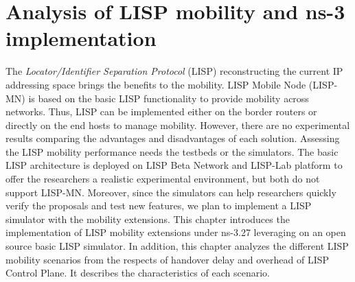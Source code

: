 
\chapter{Analysis of LISP mobility and ns-3 implementation}
\label{cha:ns-3}

\ifpdf
    \graphicspath{{Chapter7/Pics/Raster/}{Chapter7/Pics/PDF/}{Chapter7/}}
\else
    \graphicspath{{Chapter7/Pics/Vector/}{Chapter7/}}
\fi

The \emph{Locator/Identifier Separation Protocol} (LISP) reconstructing the current IP addressing space brings the benefits to the mobility. LISP Mobile Node (LISP-MN) is based on the basic LISP functionality to provide mobility across networks. Thus, LISP can be implemented either on the border routers or directly on the end hosts to manage mobility. However, there are no experimental results comparing the advantages and disadvantages of each solution. Assessing the LISP mobility performance needs the testbeds or the simulators. The basic LISP architecture is deployed on LISP Beta Network and LISP-Lab platform to offer the researchers a realistic experimental environment, but both do not support LISP-MN. Moreover, since the simulators can help researchers quickly verify the proposals and test new features, we plan to implement a LISP simulator with the mobility extensions.
This chapter introduces the implementation of LISP mobility extensions under ns-3.27 leveraging on an open source basic LISP simulator. In addition, this chapter analyzes the different LISP mobility scenarios from the respects of handover delay and overhead of LISP Control Plane. It describes the characteristics of each scenario. %


